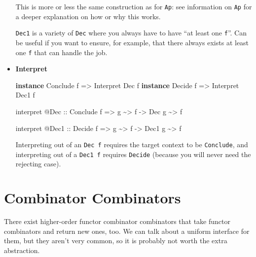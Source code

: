 \documentclass[]{article}
\newenvironment{Shaded}{}{}
\newcommand{\DataTypeTok}[1]{\textcolor[rgb]{0.56,0.13,0.00}{#1}}
\newcommand{\KeywordTok}[1]{\textcolor[rgb]{0.00,0.44,0.13}{\textbf{#1}}}
\newcommand{\NormalTok}[1]{#1}
\newcommand{\OperatorTok}[1]{\textcolor[rgb]{0.40,0.40,0.40}{#1}}
\newcommand{\OtherTok}[1]{\textcolor[rgb]{0.00,0.44,0.13}{#1}}
\begin{document}
\begin{itemize}
  This is more or less the same construction as for \texttt{Ap}: see information
  on \texttt{Ap} for a deeper explanation on how or why this works.

  \texttt{Dec1} is a variety of \texttt{Dec} where you always have to have ``at
  least one \texttt{f}''. Can be useful if you want to ensure, for example, that
  there always exists at least one \texttt{f} that can handle the job.
\item
  \textbf{Interpret}

\begin{Shaded}
\begin{Highlighting}[]
\KeywordTok{instance} \DataTypeTok{Conclude}\NormalTok{ f }\OtherTok{=\textgreater{}} \DataTypeTok{Interpret} \DataTypeTok{Dec}\NormalTok{  f}
\KeywordTok{instance} \DataTypeTok{Decide}\NormalTok{   f }\OtherTok{=\textgreater{}} \DataTypeTok{Interpret} \DataTypeTok{Dec1}\NormalTok{ f}

\NormalTok{interpret }\OperatorTok{@}\DataTypeTok{Dec}
\OtherTok{    ::} \DataTypeTok{Conclude}\NormalTok{ f}
    \OtherTok{=\textgreater{}}\NormalTok{ g }\OperatorTok{\textasciitilde{}\textgreater{}}\NormalTok{ f}
    \OtherTok{{-}\textgreater{}} \DataTypeTok{Dec}\NormalTok{ g }\OperatorTok{\textasciitilde{}\textgreater{}}\NormalTok{ f}

\NormalTok{interpret }\OperatorTok{@}\DataTypeTok{Dec1}
\OtherTok{    ::} \DataTypeTok{Decide}\NormalTok{ f}
    \OtherTok{=\textgreater{}}\NormalTok{ g }\OperatorTok{\textasciitilde{}\textgreater{}}\NormalTok{ f}
    \OtherTok{{-}\textgreater{}} \DataTypeTok{Dec1}\NormalTok{ g }\OperatorTok{\textasciitilde{}\textgreater{}}\NormalTok{ f}
\end{Highlighting}
\end{Shaded}

  Interpreting out of an \texttt{Dec\ f} requires the target context to be
  \texttt{Conclude}, and interpreting out of a \texttt{Dec1\ f} requires
  \texttt{Decide} (because you will never need the rejecting case).
\end{itemize}

\section{Combinator Combinators}\label{combinator-combinators}

There exist higher-order functor combinator combinators that take functor
combinators and return new ones, too. We can talk about a uniform interface for
them, but they aren't very common, so it is probably not worth the extra
abstraction.
\end{document}

